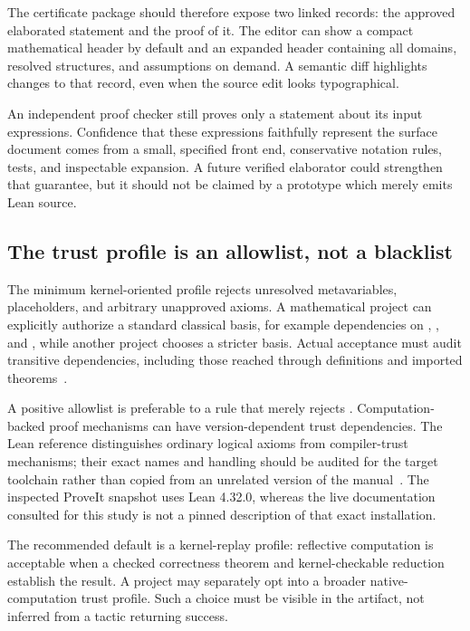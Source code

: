 \documentclass[11pt,letterpaper]{article}
\theoremstyle{definition}
\theoremstyle{remark}
\newcommand{\code}[1]{\texttt{\detokenize{#1}}}
\begin{document}
The certificate package should therefore expose two linked records: the approved elaborated statement and the proof of it. The editor can show a compact mathematical header by default and an expanded header containing all domains, resolved structures, and assumptions on demand. A semantic diff highlights changes to that record, even when the source edit looks typographical.

An independent proof checker still proves only a statement about its input expressions. Confidence that these expressions faithfully represent the surface document comes from a small, specified front end, conservative notation rules, tests, and inspectable expansion. A future verified elaborator could strengthen that guarantee, but it should not be claimed by a prototype which merely emits Lean source.

\subsection{The trust profile is an allowlist, not a blacklist}
The minimum kernel-oriented profile rejects unresolved metavariables, placeholders, and arbitrary unapproved axioms. A mathematical project can explicitly authorize a standard classical basis, for example dependencies on \code{propext}, \code{Classical.choice}, and \code{Quot.sound}, while another project chooses a stricter basis. Actual acceptance must audit transitive dependencies, including those reached through definitions and imported theorems~\cite{lean-axioms}.

A positive allowlist is preferable to a rule that merely rejects \code{sorryAx}. Computation-backed proof mechanisms can have version-dependent trust dependencies. The Lean reference distinguishes ordinary logical axioms from compiler-trust mechanisms; their exact names and handling should be audited for the target toolchain rather than copied from an unrelated version of the manual~\cite{lean-axioms}. The inspected ProveIt snapshot uses Lean 4.32.0, whereas the live documentation consulted for this study is not a pinned description of that exact installation.

The recommended default is a kernel-replay profile: reflective computation is acceptable when a checked correctness theorem and kernel-checkable reduction establish the result. A project may separately opt into a broader native-computation trust profile. Such a choice must be visible in the artifact, not inferred from a tactic returning success.
\end{document}
